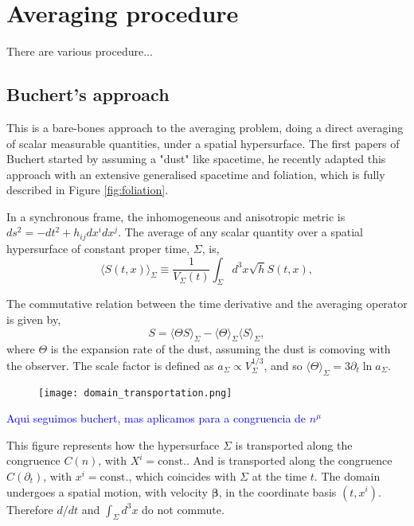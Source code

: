 \chapter{Averaging procedure}

There are various procedure...

\section{Buchert's approach}

This is a bare-bones approach to the averaging problem, doing a direct averaging of scalar measurable quantities, under a spatial hypersurface. The first papers of Buchert started by assuming a "dust" like spacetime\cite{Buchert_2000}\cite{Buchert_2001}, he recently adapted this approach with an extensive generalised spacetime\cite{Buchert_2020} and foliation, which is fully described in Figure \ref{fig:foliation}.
   
In a synchronous frame, the inhomogeneous and anisotropic metric is $ds^2=-dt^2+h_{ij}dx^idx^j$. The average of any scalar quantity over a spatial hypersurface of constant proper time, $\Sigma$, is,
\begin{equation}
	\langle S(t,x)\rangle_{\Sigma}\equiv \frac{1}{V_{\Sigma}(t)}\int_{\Sigma} d^3x \sqrt{h}S(t,x),
    \label{eqn:cbuchert_average}
\end{equation}

The commutative relation between the time derivative and the averaging operator is given by,
\begin{equation}
	[\partial_t \cdot, \langle\cdot \rangle_{\Sigma}] S=\langle \Theta S\rangle_{\Sigma}-\langle \Theta\rangle_{\Sigma}\langle S\rangle_{\Sigma},
	\label{eqn:comoving_commutation_rule_buchert}
\end{equation}
where $\Theta$ is the expansion rate of the dust, assuming the dust is comoving with the observer. The scale factor is defined as $a_{\Sigma}\propto V_{\Sigma}^{1/3}$, and so $\langle\Theta\rangle_{\Sigma}=3\partial_t \ln a_{\Sigma}$.



\begin{figure}[h]
	\centering
	\texttt{[image: domain\_transportation.png]}
\end{figure}

\textcolor{blue}{Aqui seguimos buchert, mas aplicamos para a congruencia de $n^\mu$}

This figure represents how the hypersurface $\Sigma$ is transported along the congruence $C(n)$, with $X^i=\text{const.}$. 
And is transported along the congruence $C(\partial_t)$, with $x^i=\text{const.}$, which coincides with $\Sigma$ at the time $t$. 
The domain undergoes a spatial motion, with velocity $\mathbf{\beta}$, in the coordinate basis $(t,x^i)$. Therefore $d/dt$ and $\int_\Sigma d^3x$ do not commute.

